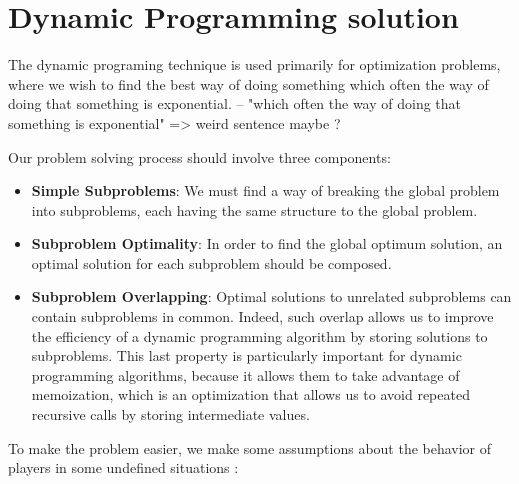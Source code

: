 \documentclass[a4paper,12pt,fleqn]{article}
\begin{document}



\newpage


\section{Dynamic Programming solution} \label{sec:dp_solution}
The dynamic programing technique is used primarily for optimization problems, where we wish to find the best way of doing something which often the way of doing that something is exponential.
-- "which often the way of doing that something is exponential" => weird sentence maybe ?

Our problem solving process should involve three components:
\begin{itemize}
    \item \textbf{Simple Subproblems}: We must find a way of breaking the global problem into subproblems, each having the same structure to the global problem.
    \item \textbf{Subproblem Optimality}: In order to find the global optimum solution, an optimal solution for each subproblem should be composed.
    \item \textbf{Subproblem Overlapping}: Optimal solutions to unrelated subproblems can contain subproblems in common. Indeed, such overlap allows us to improve the efficiency of a dynamic programming algorithm by storing solutions to subproblems. This last property is particularly important for dynamic programming algorithms, because it allows them to take advantage of memoization, which is an optimization that allows us to avoid repeated recursive calls by storing intermediate values.
\end{itemize}


To make the problem easier, we make some assumptions about the behavior of players in some undefined situations :
\end{document}
